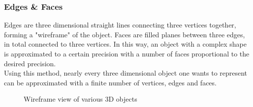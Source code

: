 \documentclass[12pt, a4paper]{article}
\begin{document}
\subsubsection{Edges \& Faces}
Edges are three dimensional straight lines connecting %
three vertices together, forming a "wireframe" of the object. Faces are filled
planes between three edges, in total connected to three vertices. In this way, an
object with a complex shape is approximated to a certain precision with a number
of faces proportional to the desired precision. \\

Using this method, nearly every three dimensional object one wants to represent
can be approximated with a finite number of vertices, edges and faces. \\

\begin{figure}[H]
    \centering
    \qquad
    \qquad
    \caption{Wireframe view of various 3D objects}
    \label{teapot}
\end{figure}
\end{document}
